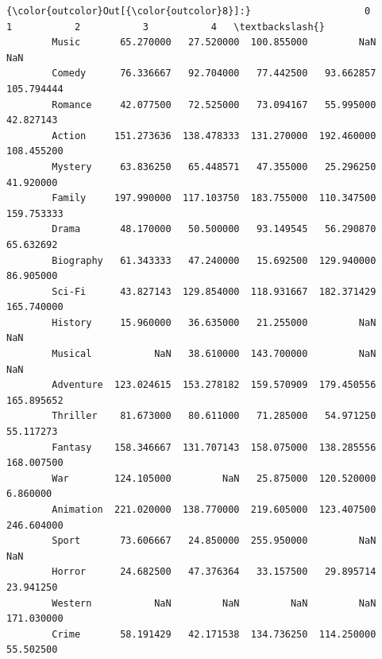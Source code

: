 \documentclass[11pt]{article}
\begin{document}
\begin{Verbatim}[commandchars=\\\{\}]
{\color{outcolor}Out[{\color{outcolor}8}]:}                    0           1           2           3           4   \textbackslash{}
        Music       65.270000   27.520000  100.855000         NaN         NaN   
        Comedy      76.336667   92.704000   77.442500   93.662857  105.794444   
        Romance     42.077500   72.525000   73.094167   55.995000   42.827143   
        Action     151.273636  138.478333  131.270000  192.460000  108.455200   
        Mystery     63.836250   65.448571   47.355000   25.296250   41.920000   
        Family     197.990000  117.103750  183.755000  110.347500  159.753333   
        Drama       48.170000   50.500000   93.149545   56.290870   65.632692   
        Biography   61.343333   47.240000   15.692500  129.940000   86.905000   
        Sci-Fi      43.827143  129.854000  118.931667  182.371429  165.740000   
        History     15.960000   36.635000   21.255000         NaN         NaN   
        Musical           NaN   38.610000  143.700000         NaN         NaN   
        Adventure  123.024615  153.278182  159.570909  179.450556  165.895652   
        Thriller    81.673000   80.611000   71.285000   54.971250   55.117273   
        Fantasy    158.346667  131.707143  158.075000  138.285556  168.007500   
        War        124.105000         NaN   25.875000  120.520000    6.860000   
        Animation  221.020000  138.770000  219.605000  123.407500  246.604000   
        Sport       73.606667   24.850000  255.950000         NaN         NaN   
        Horror      24.682500   47.376364   33.157500   29.895714   23.941250   
        Western           NaN         NaN         NaN         NaN  171.030000   
        Crime       58.191429   42.171538  134.736250  114.250000   55.502500   
        

\end{Verbatim}
\end{document}
